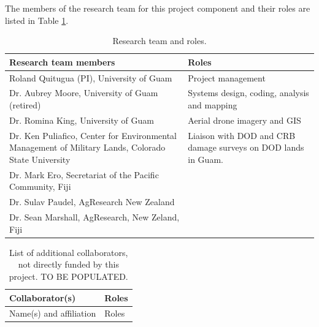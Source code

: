 \documentclass[11pt,english,letterpaper]{scrartcl}
\begin{document}
The members of the research team for this project component and their roles are listed in Table \ref{tbl:team}.

\begin{table}[h]
	\centering
	\caption{Research team and roles.}	
	
	\begin{tabular}{p{2.2in}p{4in}}
		\toprule
		\textbf{Research team members} & \textbf{Roles} \\ \midrule
		
		Roland Quitugua (PI), University of Guam & Project management \\ \midrule
		
		Dr. Aubrey Moore, University of Guam (retired) & Systems design, coding, analysis and mapping \\ \midrule
		
		Dr. Romina King, University of Guam & Aerial drone imagery and GIS \\ \midrule
		
		Dr. Ken Puliafico, Center for Environmental Management of Military Lands, Colorado State University & Liaison with DOD and CRB damage surveys on DOD lands in Guam. \\ \midrule
		
		Dr. Mark Ero, Secretariat of the Pacific Community, Fiji & \\ \midrule
		
		Dr. Sulav Paudel, AgResearch New Zealand & \\ \midrule
		
		Dr. Sean Marshall, AgResearch, New Zeland, Fiji & \\ \bottomrule	
		
	\end{tabular}
	\label{tbl:team}
	
\end{table}

\begin{table}[h]
	\centering
	\caption{List of additional collaborators, not directly funded by this project. TO BE POPULATED.}	
	
	\begin{tabular}{p{2.2in}p{4in}}
		\toprule
		\textbf{Collaborator(s)} & \textbf{Roles} \\ \midrule
		
		Name(s) and affiliation & Roles \\ \midrule
				
	\end{tabular}
	\label{tbl:team-additional}	
\end{table}
\end{document}
